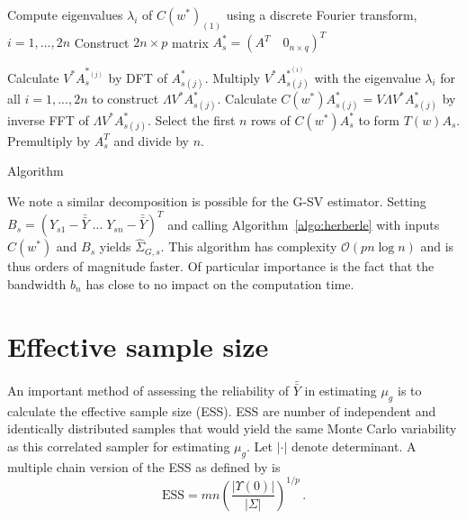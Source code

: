 \documentclass[11pt]{article}
\theoremstyle{remark}
\begin{document}
\begin{algorithm}[htbp] 
\DontPrintSemicolon
\SetAlgoLined
Compute eigenvalues $\lambda_i$ of  $C(w^*)_{(1)}$ using a discrete Fourier transform, $i = 1, \dots, 2n$\;
Construct $2n \times p$ matrix $A^*_s = (A^T  \quad 0_{n \times q})^T$\;

    { 
    Calculate $V^*A_s^{*_{(j)}}$ by DFT of $A^*_{s(j)}$.\;
    Multiply $V^* A_{s(j)}^{*^{(i)}}$ with the eigenvalue $\lambda_i$ for all $i = 1, ..., 2n$ to construct $\Lambda V^* A_{s(j)}^*$.\;
    Calculate $C(w^*)A^*_{s(j)} = V \Lambda V^* A_{s(j)}^*$ by inverse FFT of $\Lambda V^* A_{s(j)}^*$.\;
    }
 Select the first $n$ rows of $C(w^*)A^*_s$ to form $T(w)A_s$.\;
 Premultiply by $A_s^T$ and divide by $n$.\;
 \caption{\cite{heberle2017fast} Algorithm}
 \label{algo:herberle}
\end{algorithm}


We note a similar decomposition is possible for the G-SV estimator. Setting $B_s = (Y_{s1} - \bar{\bar{Y}} \; \dots \; Y_{sn} - \bar{\bar{Y}})^T$ and calling Algorithm~\ref{algo:herberle} with inputs $C(w^*)$ and $B_s$ yields $\hat{\Sigma}_{G,s}$. This algorithm has complexity $\mathcal{O}(p n \log n)$ and is thus orders of magnitude faster. Of particular importance is the fact that the bandwidth $b_n$ has close to no impact on the computation time.

\section{Effective sample size} \label{sec:ess}

An important method of assessing the reliability of $\bar{\bar{Y}}$ in estimating $\mu_g$ is to calculate the effective sample size (ESS). ESS are number of independent and identically distributed samples that would yield the same Monte Carlo variability as this correlated sampler for estimating $\mu_g$. Let $|\cdot|$ denote determinant. A multiple chain version of the ESS as defined by \cite{vats2019multivariate} is
\[
\textrm{ESS} = mn \left(\dfrac{|\Upsilon(0)|}{|\Sigma|}\right)^{1/p}\, .
\]
\end{document}
